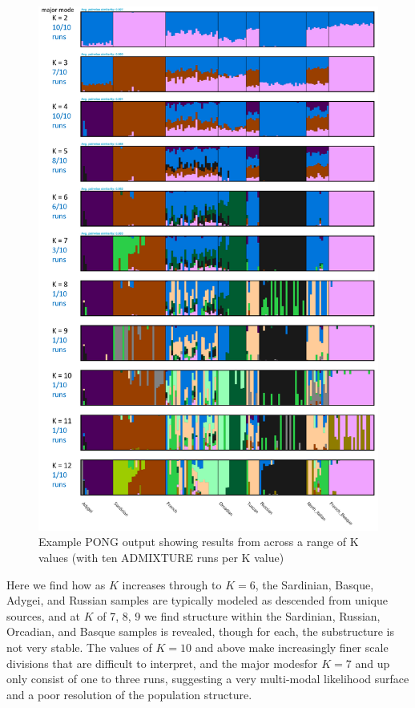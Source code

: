 \documentclass[smallextended]{svjour3}       %
\begin{document}
\begin{figure}
\includegraphics[width=1\linewidth]{./plot/H938_Euro_LDprune_12K_10r} \caption{Example PONG output showing results from across a range of K values (with ten ADMIXTURE runs per K value)}\label{fig:unnamed-chunk-15}
\end{figure}

Here we find how as \(K\) increases through to \(K=6\), the Sardinian,
Basque, Adygei, and Russian samples are typically modeled as descended
from unique sources, and at \(K\) of 7, 8, 9 we find structure within
the Sardinian, Russian, Orcadian, and Basque samples is revealed, though
for each, the substructure is not very stable. The values of \(K=10\)
and above make increasingly finer scale divisions that are difficult to
interpret, and the major modesfor \(K=7\) and up only consist of one to
three runs, suggesting a very multi-modal likelihood surface and a poor
resolution of the population structure.
\end{document}
